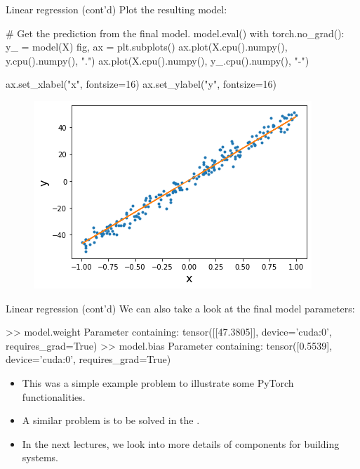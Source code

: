 \begin{frame}[fragile]{Linear regression (cont'd)}
\vspace{-6mm}
Plot the resulting model:
\begin{python}
# Get the prediction from the final model.
model.eval()
with torch.no_grad():
    y_ = model(X)
fig, ax = plt.subplots()
ax.plot(X.cpu().numpy(), y.cpu().numpy(), ".")
ax.plot(X.cpu().numpy(), y_.cpu().numpy(), "-")

ax.set_xlabel("x", fontsize=16)
ax.set_ylabel("y", fontsize=16)
\end{python}
\begin{figure}
                        \centering
                        \includegraphics[width=.5\linewidth]{./figures/regression_example.png}
\end{figure}
\end{frame}


\begin{frame}[fragile]{Linear regression (cont'd)}
\vspace{-6mm}
We can also take a look at the final model parameters:
\begin{python}
>> model.weight
Parameter containing:
tensor([[47.3805]], device='cuda:0', requires_grad=True)
>> model.bias
Parameter containing:
tensor([0.5539], device='cuda:0', requires_grad=True)
\end{python}
\begin{itemize}
\item This was a simple example problem to illustrate some PyTorch functionalities.
\item A similar problem is to be solved in the .
\item In the next lectures, we look into more details of components for building systems.
\end{itemize}
\end{frame}


